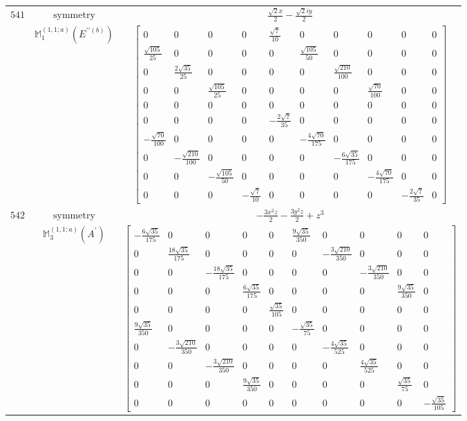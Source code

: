 \documentclass[fleqn,8pt,landscape]{jsarticle}
\begin{document}
\begin{longtable}{ccc}
$ 541 $ & $ \text{symmetry} $ & $ \frac{\sqrt{2} x}{2} - \frac{\sqrt{2} i y}{2} $ \\
$  $ & $ \mathbb{M}_{1}^{(1,1;a)}(E^{\prime\prime(b)}) $ & $ \begin{bmatrix} 0 & 0 & 0 & 0 & \frac{\sqrt{7}}{10} & 0 & 0 & 0 & 0 & 0 \\ \frac{\sqrt{105}}{25} & 0 & 0 & 0 & 0 & \frac{\sqrt{105}}{50} & 0 & 0 & 0 & 0 \\ 0 & \frac{2 \sqrt{35}}{25} & 0 & 0 & 0 & 0 & \frac{\sqrt{210}}{100} & 0 & 0 & 0 \\ 0 & 0 & \frac{\sqrt{105}}{25} & 0 & 0 & 0 & 0 & \frac{\sqrt{70}}{100} & 0 & 0 \\ 0 & 0 & 0 & 0 & 0 & 0 & 0 & 0 & 0 & 0 \\ 0 & 0 & 0 & 0 & - \frac{2 \sqrt{7}}{35} & 0 & 0 & 0 & 0 & 0 \\ - \frac{\sqrt{70}}{100} & 0 & 0 & 0 & 0 & - \frac{4 \sqrt{70}}{175} & 0 & 0 & 0 & 0 \\ 0 & - \frac{\sqrt{210}}{100} & 0 & 0 & 0 & 0 & - \frac{6 \sqrt{35}}{175} & 0 & 0 & 0 \\ 0 & 0 & - \frac{\sqrt{105}}{50} & 0 & 0 & 0 & 0 & - \frac{4 \sqrt{70}}{175} & 0 & 0 \\ 0 & 0 & 0 & - \frac{\sqrt{7}}{10} & 0 & 0 & 0 & 0 & - \frac{2 \sqrt{7}}{35} & 0 \end{bmatrix} $ \\ \hline
$ 542 $ & $ \text{symmetry} $ & $ - \frac{3 x^{2} z}{2} - \frac{3 y^{2} z}{2} + z^{3} $ \\
$  $ & $ \mathbb{M}_{3}^{(1,1;a)}(A^{\prime}) $ & $ \begin{bmatrix} - \frac{6 \sqrt{35}}{175} & 0 & 0 & 0 & 0 & \frac{9 \sqrt{35}}{350} & 0 & 0 & 0 & 0 \\ 0 & \frac{18 \sqrt{35}}{175} & 0 & 0 & 0 & 0 & - \frac{3 \sqrt{210}}{350} & 0 & 0 & 0 \\ 0 & 0 & - \frac{18 \sqrt{35}}{175} & 0 & 0 & 0 & 0 & - \frac{3 \sqrt{210}}{350} & 0 & 0 \\ 0 & 0 & 0 & \frac{6 \sqrt{35}}{175} & 0 & 0 & 0 & 0 & \frac{9 \sqrt{35}}{350} & 0 \\ 0 & 0 & 0 & 0 & \frac{\sqrt{35}}{105} & 0 & 0 & 0 & 0 & 0 \\ \frac{9 \sqrt{35}}{350} & 0 & 0 & 0 & 0 & - \frac{\sqrt{35}}{75} & 0 & 0 & 0 & 0 \\ 0 & - \frac{3 \sqrt{210}}{350} & 0 & 0 & 0 & 0 & - \frac{4 \sqrt{35}}{525} & 0 & 0 & 0 \\ 0 & 0 & - \frac{3 \sqrt{210}}{350} & 0 & 0 & 0 & 0 & \frac{4 \sqrt{35}}{525} & 0 & 0 \\ 0 & 0 & 0 & \frac{9 \sqrt{35}}{350} & 0 & 0 & 0 & 0 & \frac{\sqrt{35}}{75} & 0 \\ 0 & 0 & 0 & 0 & 0 & 0 & 0 & 0 & 0 & - \frac{\sqrt{35}}{105} \end{bmatrix} $ \\ \hline

\end{longtable}
\end{document}
